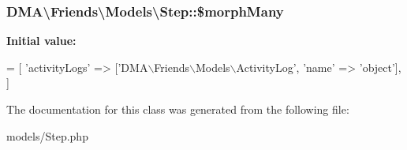 \subsubsection[{\$morph\+Many}]{\setlength{\rightskip}{0pt plus 5cm}D\+M\+A\textbackslash{}\+Friends\textbackslash{}\+Models\textbackslash{}\+Step\+::\$morph\+Many}\label{classDMA_1_1Friends_1_1Models_1_1Step_ae1aa1ff83758491327ea35861828b233}
{\bfseries Initial value\+:}
\begin{DoxyCode}
= [ 
        \textcolor{stringliteral}{'activityLogs'}  => [\textcolor{stringliteral}{'DMA\(\backslash\)Friends\(\backslash\)Models\(\backslash\)ActivityLog'}, \textcolor{stringliteral}{'name'} => \textcolor{stringliteral}{'object'}],
    ]
\end{DoxyCode}


The documentation for this class was generated from the following file\+:\begin{DoxyCompactItemize}
\item 
models/Step.\+php\end{DoxyCompactItemize}
